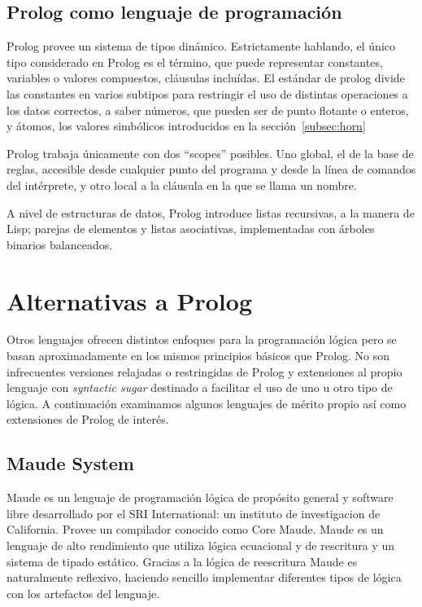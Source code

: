 \documentclass[11pt,captions=nooneline,DIV=14, parskip=full]{scrartcl}
\begin{document}
\subsection{Prolog como lenguaje de programación}
Prolog provee un sistema de tipos dinámico. Estrictamente hablando, el único tipo considerado en Prolog es el término, que puede representar constantes, variables o valores compuestos, cláusulas incluídas. El estándar de prolog divide las constantes en varios subtipos para restringir el uso de distintas operaciones a los datos correctos, a saber números, que pueden ser de punto flotante o enteros, y átomos, los valores simbólicos introducidos en la sección~\ref{subsec:horn}

Prolog trabaja únicamente con dos ``scopes'' posibles. Uno global, el de la base de reglas, accesible desde cualquier punto del programa y desde la línea de comandos del intérprete, y otro local a la cláusula en la que se llama un nombre.

A nivel de estructuras de datos, Prolog introduce listas recursivas, a la manera de Lisp; parejas de elementos y listas asociativas, implementadas con árboles binarios balanceados.

\section{Alternativas a Prolog}
\label{sec:alt-prolog}
Otros lenguajes ofrecen distintos enfoques para la programación lógica pero se basan aproximadamente en los mismos principios básicos que Prolog. No son infrecuentes versiones relajadas o restringidas de Prolog y extensiones al propio lenguaje con \textit{syntactic sugar} destinado a facilitar el uso de uno u otro tipo de lógica. A continuación examinamos algunos lenguajes de mérito propio así como extensiones de Prolog de interés.

\subsection{Maude System}
Maude es un lenguaje de programación lógica de propósito general y software libre desarrollado por el SRI International: un instituto de investigacion de California. Provee un compilador conocido como Core Maude. Maude es un lenguaje de alto rendimiento que utiliza lógica ecuacional y de rescritura y un sistema de tipado estático. Gracias a la lógica de reescritura Maude es naturalmente reflexivo, haciendo sencillo implementar diferentes tipos de lógica con los artefactos del lenguaje.
\end{document}
